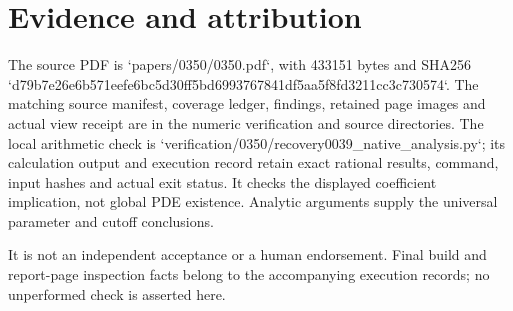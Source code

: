 \documentclass[10pt]{article}
\begin{document}
\section*{Evidence and attribution}
The source PDF is `papers/0350/0350.pdf`, with 433151 bytes and SHA256 `d79b7e26e6b571eefe6bc5d30ff5bd6993767841df5aa5f8fd3211cc3c730574`. The matching source manifest, coverage ledger, findings, retained page images and actual view receipt are in the numeric verification and source directories. The local arithmetic check is `verification/0350/recovery0039\_native\_analysis.py`; its calculation output and execution record retain exact rational results, command, input hashes and actual exit status. It checks the displayed coefficient implication, not global PDE existence. Analytic arguments supply the universal parameter and cutoff conclusions.\par
It is not an independent acceptance or a human endorsement. Final build and report-page inspection facts belong to the accompanying execution records; no unperformed check is asserted here.\par
\end{document}
